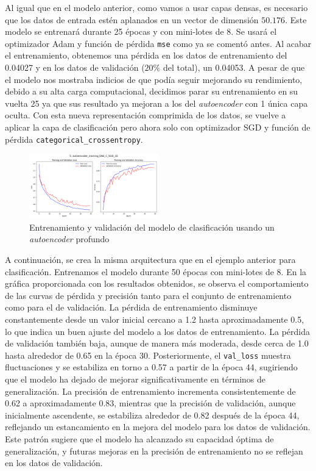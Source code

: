 Al igual que en el modelo anterior, como vamos a usar capas densas, es necesario que los datos de entrada estén aplanados en un vector de dimensión $50.176$. Este modelo se entrenará durante 25 épocas y con mini-lotes de 8. Se usará el optimizador Adam y función de pérdida \lstinline|mse| como ya se comentó antes. Al acabar el entrenamiento, obtenemos una pérdida en los datos de entrenamiento del 0.04027 y en los datos de validación ($20\%$ del total), un 0.04053. A pesar de que el modelo nos mostraba indicios de que podía seguir mejorando su rendimiento, debido a su alta carga computacional, decidimos parar su entrenamiento en su vuelta 25 ya que sus resultado ya mejoran a los del \textit{autoencoder} con 1 única capa oculta. Con esta nueva representación comprimida de los datos, se vuelve a aplicar la capa de clasificación pero ahora solo con optimizador SGD y función de pérdida \lstinline|categorical_crossentropy|.

\begin{figure}[H]
    \centering
    \includegraphics[width=0.5\textwidth]{img/daeMMC_sgd_ce.png}
    \caption{Entrenamiento y validación del modelo de clasificación usando un \textit{autoencoder} profundo}
    \label{fig:dae_sgd_mse}
\end{figure}


A continuación, se crea la misma arquitectura que en el ejemplo anterior para clasificación. Entrenamos el modelo durante 50 épocas con mini-lotes de 8. En la gráfica proporcionada con los resultados obtenidos, se observa el comportamiento de las curvas de pérdida y precisión tanto para el conjunto de entrenamiento como para el de validación. La pérdida de entrenamiento disminuye constantemente desde un valor inicial cercano a 1.2 hasta aproximadamente 0.5, lo que indica un buen ajuste del modelo a los datos de entrenamiento. La pérdida de validación también baja, aunque de manera más moderada, desde cerca de 1.0 hasta alrededor de 0.65 en la época 30. Posteriormente, el \lstinline|val_loss| muestra fluctuaciones y se estabiliza en torno a 0.57 a partir de la época 44, sugiriendo que el modelo ha dejado de mejorar significativamente en términos de generalización. La precisión de entrenamiento incrementa consistentemente de 0.62 a aproximadamente 0.83, mientras que la precisión de validación, aunque inicialmente ascendente, se estabiliza alrededor de 0.82 después de la época 44, reflejando un estancamiento en la mejora del modelo para los datos de validación. Este patrón sugiere que el modelo ha alcanzado su capacidad óptima de generalización, y futuras mejoras en la precisión de entrenamiento no se reflejan en los datos de validación.

